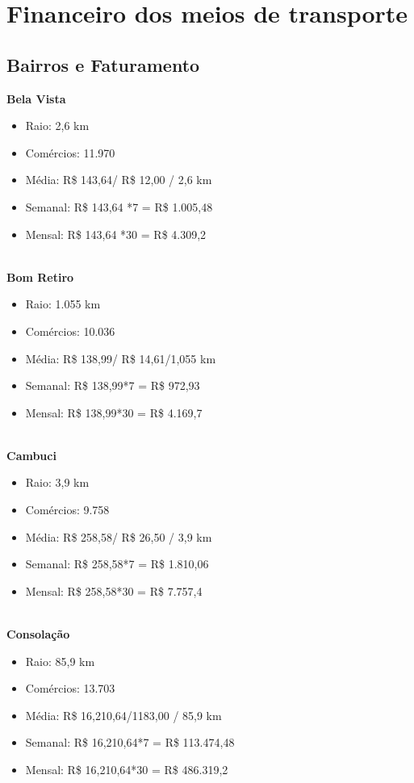 \chapter{Financeiro dos meios de transporte}
\label{ch:identificador}
\section{Bairros e Faturamento}

\textbf{Bela Vista}
\begin{itemize}
    \item Raio: 2,6 km
    \item Comércios: 11.970
    \item Média: R\$ 143,64/ R\$ 12,00 / 2,6 km
    \item Semanal: R\$ 143,64 *7 = R\$ 1.005,48
    \item Mensal: R\$ 143,64 *30 = R\$ 4.309,2
\end{itemize} \\

\textbf{Bom Retiro}
\begin{itemize}
    \item Raio: 1.055 km
    \item Comércios: 10.036
    \item Média: R\$ 138,99/ R\$ 14,61/1,055 km
    \item Semanal: R\$ 138,99*7 = R\$ 972,93
    \item Mensal: R\$ 138,99*30 = R\$ 4.169,7
\end{itemize}\\

\textbf{Cambuci}
\begin{itemize}
    \item Raio: 3,9 km
    \item Comércios: 9.758
    \item Média: R\$ 258,58/ R\$ 26,50 / 3,9 km
    \item Semanal: R\$ 258,58*7 = R\$ 1.810,06
    \item Mensal: R\$ 258,58*30 = R\$ 7.757,4
\end{itemize}\\

\textbf{Consolação}
\begin{itemize}
    \item Raio: 85,9 km
    \item Comércios: 13.703
    \item Média: R\$ 16,210,64/1183,00 / 85,9 km
    \item Semanal: R\$ 16,210,64*7 = R\$ 113.474,48
    \item Mensal: R\$ 16,210,64*30 = R\$ 486.319,2
\end{itemize}\\ 

